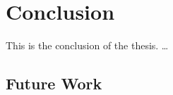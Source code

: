 
\chapter{Conclusion}
\label{ch:Conclusion}
This is the conclusion of the thesis.
\dots

\section{Future Work}
\label{sec:Conclusion:FutureWork}
